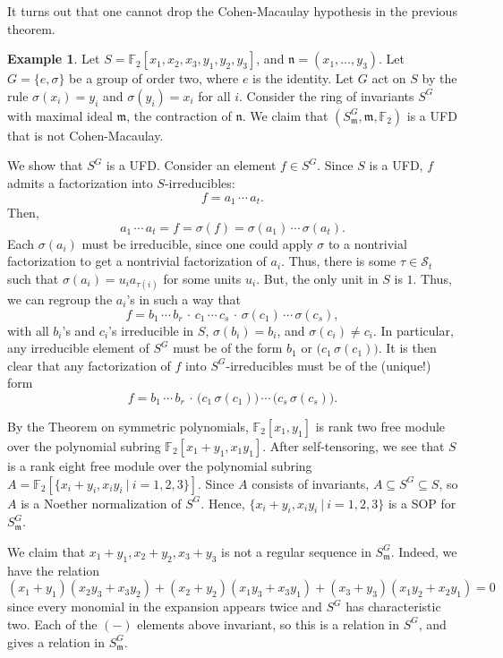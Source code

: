 \documentclass[11pt]{book}
\numberwithin{equation}{section}
\numberwithin{theorem}{chapter}
\theoremstyle{definition}
\newtheorem{example}[theorem]{Example}
\newtheorem*{basic properties}{Basic Properties}
\newtheorem*{Important Remark}{Important Remark}
\theoremstyle{remark}
\newcommand{\FF}{\mathbb{F}}
\newcommand{\m}{\mathfrak{m}}
\newcommand{\n}{\mathfrak{n}}
\begin{document}
It turns out that one cannot drop the Cohen-Macaulay hypothesis in the previous theorem.

\begin{example}
	Let $S=\FF_2[x_1,x_2,x_3,y_1,y_2,y_3]$, and $\n=(x_1,\dots,y_3)$. Let $G=\{e,\sigma\}$ be a group of order two, where $e$ is the identity. Let $G$ act on $S$ by the rule $\sigma(x_i)=y_i$ and $\sigma(y_i)=x_i$ for all $i$. Consider the ring of invariants $S^G$ with maximal ideal $\m$, the contraction of $\n$. We claim that $(S^G_\m, \m, \FF_2)$ is a UFD that is not Cohen-Macaulay.
	
	\fbox{$S^G_\m$ is a UFD:} We show that $S^G$ is a UFD. Consider an element $f\in S^G$. Since $S$ is a UFD, $f$ admits a factorization into $S$-irreducibles: \[f=a_1 \, \cdots  \, a_t.\] Then, \[a_1 \, \cdots \, a_t=f=\sigma(f)=\sigma(a_1) \, \cdots \, \sigma(a_t).\] Each $\sigma(a_i)$ must be irreducible, since one could apply $\sigma$ to a nontrivial factorization to get a nontrivial factorization of $a_i$. Thus, there is some $\tau\in \mathcal{S}_t$ such that $\sigma(a_i)=u_i a_{\tau(i)}$ for some units $u_i$. But, the only unit in $S$ is $1$. Thus, we can regroup the $a_i$'s in such a way that
	\[f = b_1 \, \cdots \, b_r \, \cdot \,  c_1 \, \cdots \, c_s \, \cdot \, \sigma(c_1) \, \cdots \, \sigma(c_s), \]
	with all $b_i$'s and $c_i$'s irreducible in $S$, $\sigma(b_i)=b_i$, and $\sigma(c_i)\neq c_i$. In particular, any irreducible element of $S^G$ must be of the form $b_1$ or $\big(c_1 \, \sigma(c_1)\big)$. It is then clear that any factorization of $f$ into $S^G$-irreducibles must be of the (unique!) form
  \[f = b_1 \, \cdots \,  b_r \, \cdot \, \big(c_1 \, \sigma(c_1)\big) \, \cdots \, \big(c_s \,\sigma(c_s)\big). \]
  
  \fbox{$S^G_\m$ is Cohen-Macaulay:} By the Theorem on symmetric polynomials, $\FF_2[x_1,y_1]$ is rank two free module over the polynomial subring $\FF_2[x_1 + y_1, x_1 y_1]$. After self-tensoring, we see that $S$ is a rank eight free module over the polynomial subring $A=\FF_2[\{x_i + y_i, x_i y_i \ | \ i=1,2,3\}]$. Since $A$ consists of invariants, $A \subseteq S^G \subseteq S$, so $A$ is a Noether normalization of $S^G$. Hence, $\{x_i + y_i, x_i y_i \ | \ i=1,2,3\}$ is a SOP for $S^G_\m$.
  
  We claim that $x_1+y_1, x_2+y_2, x_3+y_3$ is not a regular sequence in $S^G_\m$. Indeed, we have the relation
  \[ (x_1+y_1)(x_2y_3 + x_3 y_2) + (x_2+ y_2)(x_1 y_3+x_3 y_1) + (x_3+y_3)(x_1 y_2 + x_2 y_1) = 0 \]
  since every monomial in the expansion appears twice and $S^G$ has characteristic two. Each of the $(-)$ elements above invariant, so this is a relation in $S^G$, and gives a relation in $S^G_\m$.
  

\end{example}
\end{document}
